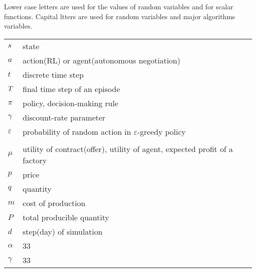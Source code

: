 Lower case letters are used for the values of random variables and for scalar functions. Capital ltters are used for random variables and major algorithms variables.

\begin{tabular}{p{1.5cm} p{12cm}}
$s$ & state \\
$a$ & action(RL) or agent(autonomous negotiation)\\
$t$ & discrete time step \\
$T$ & final time step of an episode \\
$\pi$ & policy, decision-making rule \\
$\gamma$ & discount-rate parameter \\
$\varepsilon$ & probability of random action in $\varepsilon$-greedy policy \\
\\
$\mu$ & utility of contract(offer), utility of agent, expected profit of a factory \\
$p$ & price \\
$q$ & quantity \\
$m$ & cost of production \\
$P$ & total producible quantity \\
$d$ & step(day) of simulation \\
$\alpha$ & 33 \\
$\gamma$ & 33 \\
\end{tabular}



